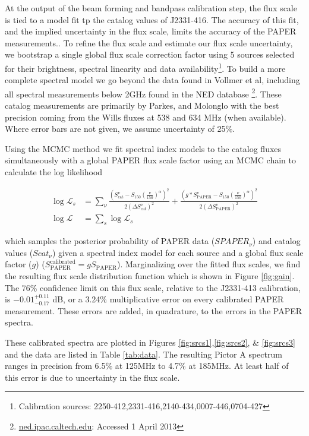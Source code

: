 \documentclass[preprint]{aastex}
\newcommand{\PAPER}{\mathrm{PAPER}}
\begin{document}
At the output of the beam forming and bandpass calibration step, the flux scale
 is tied to a model fit tp the catalog values of
J2331-416. The accuracy of this fit, and the implied uncertainty in the flux
scale, limits the accuracy of the PAPER measurements..  To refine the flux
scale and estimate our flux scale uncertainty, we bootstrap a single global flux scale 
correction factor using 5
sources selected for their brightness, spectral linearity and data
availability\footnote{Calibration sources:
2250-412,2331-416,2140-434,0007-446,0704-427}. To build a more complete
spectral model we go beyond the data found in Vollmer et al, including all spectral
measurements below 2GHz found in the NED database \footnote{\url{ned.ipac.caltech.edu}: Accessed 1 April 2013}.  These catalog measurements
are primarily by Parkes, and Molonglo with the best precision coming from the
Wills fluxes at 538 and 634 MHz (when available). Where error bars are not
given, we assume uncertainty of 25\%. 

Using the MCMC method we fit spectral index models to the catalog fluxes
 simultaneously with a global PAPER flux scale factor using  an MCMC chain to calculate the log likelihood

\begin{align}
\log\mathcal{L}_s &= \sum_{\nu}\frac{ (S_\textrm{cat}^{\nu}  - S_{150}  \left(\frac{\nu}{150}\right)^\alpha)^2}{2(\Delta S_\textrm{cat}^\nu)^2} +
\frac{ (g*S_\PAPER^{\nu}  - S_{150}\left(\frac{\nu}{150}\right)^\alpha)^2}{2(\Delta S_\PAPER^\nu)^2}\\
\log\mathcal{L} &= \sum_{s} \log\mathcal{L}_s
\end{align}


which samples the posterior probability of PAPER data ($SPAPER_{\nu}$) and
catalog values ($Scat_{\nu}$) given a spectral index model for each source and
a global flux scale factor ($g$) ($S_\PAPER^\textrm{calibrated} = g S_\PAPER$).
Marginalizing over the fitted flux scales, we find the resulting flux scale distribution function which is shown in Figure
\ref{fig:gain}. The 76\% confidence limit on this flux scale, relative to the
J2331-413 calibration, is  $-0.01 ^{+0.11}_{-0.17}$ dB, or a 3.24\%
multiplicative error on every calibrated PAPER measurement.  These errors are added, in quadrature,
to the errors in the PAPER spectra.


These calibrated spectra are plotted in Figures \ref{fig:srcs1},\ref{fig:srcs2},
\& \ref{fig:srcs3} and the data are listed in Table \ref{tab:data}.  The
resulting Pictor A spectrum ranges in precision from 6.5\% at 125MHz to 4.7\%
at 185MHz. At least half of this error is due to uncertainty in the flux scale.  
\end{document}
